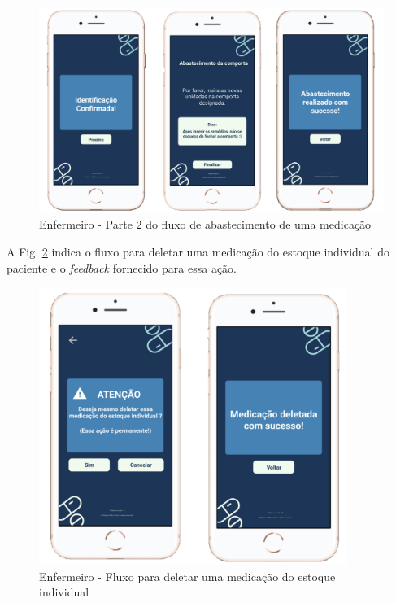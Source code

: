 \begin{figure}[H]
    \centering
    \includegraphics[width=15cm]{figuras/software/Atual_prototipo/Enfermeiro_abastecer_4.png}
    \caption{Enfermeiro - Parte 2 do fluxo de abastecimento de uma medicação}
    \label{fig:prototipo_enfermeiro_abastecer_4}
\end{figure}

A Fig. \ref{fig:prototipo_enfermeiro_abastecer_5} indica o fluxo para deletar uma medicação do estoque individual do paciente e o \textit{feedback} fornecido para essa ação.

\begin{figure}[H]
    \centering
    \includegraphics[width=10cm]{figuras/software/Atual_prototipo/Enfermeiro_abastecer_5.png}
    \caption{Enfermeiro - Fluxo para deletar uma medicação do estoque individual}
    \label{fig:prototipo_enfermeiro_abastecer_5}
\end{figure}

